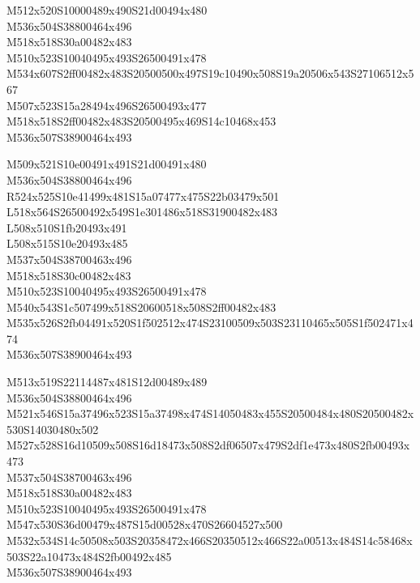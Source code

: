 \documentclass{article}
\begin{document}
\begin{multicols}{5}
\begin{center}

M512x520S10000489x490S21d00494x480 %
\\M536x504S38800464x496 %
\\M518x518S30a00482x483 %
\\M510x523S10040495x493S26500491x478 %
\\M534x607S2ff00482x483S20500500x497S19c10490x508S19a20506x543S27106512x567 %
\\M507x523S15a28494x496S26500493x477 %
\\M518x518S2ff00482x483S20500495x469S14c10468x453 %
\\M536x507S38900464x493 %
\vfil
\columnbreak

M509x521S10e00491x491S21d00491x480 %
\\M536x504S38800464x496 %
\\R524x525S10e41499x481S15a07477x475S22b03479x501 %
\\L518x564S26500492x549S1e301486x518S31900482x483 %
\\L508x510S1fb20493x491 %
\\L508x515S10e20493x485 %
\\M537x504S38700463x496 %
\\M518x518S30c00482x483 %
\\M510x523S10040495x493S26500491x478 %
\\M540x543S1c507499x518S20600518x508S2ff00482x483 %
\\M535x526S2fb04491x520S1f502512x474S23100509x503S23110465x505S1f502471x474 %
\\M536x507S38900464x493 %
\vfil
\columnbreak

M513x519S22114487x481S12d00489x489 %
\\M536x504S38800464x496 %
\\M521x546S15a37496x523S15a37498x474S14050483x455S20500484x480S20500482x530S14030480x502 %
\\M527x528S16d10509x508S16d18473x508S2df06507x479S2df1e473x480S2fb00493x473 %
\\M537x504S38700463x496 %
\\M518x518S30a00482x483 %
\\M510x523S10040495x493S26500491x478 %
\\M547x530S36d00479x487S15d00528x470S26604527x500 %
\\M532x534S14c50508x503S20358472x466S20350512x466S22a00513x484S14c58468x503S22a10473x484S2fb00492x485 %
\\M536x507S38900464x493 %
\vfil
\columnbreak


\end{center}
\end{multicols}
\end{document}
